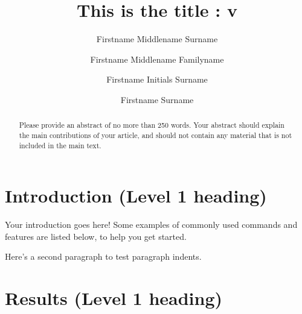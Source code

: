 \documentclass[9pt,bestpractices]{livecoms}
\title{This is the title : v\versionnumber}
\author[1*]{Firstname Middlename Surname}
\author[1,2\authfn{1}\authfn{3}]{Firstname Middlename Familyname}
\author[2\authfn{1}\authfn{4}]{Firstname Initials Surname}
\author[2*]{Firstname Surname}
\affil[1]{Institution 1}
\affil[2]{Institution 2}
\begin{document}
\begin{frontmatter}
\maketitle

\begin{abstract}
Please provide an abstract of no more than 250 words. Your abstract should explain the main contributions of your article, and should not contain any material that is not included in the main text.
\end{abstract}

\end{frontmatter}

\section{Introduction (Level 1 heading)}

Your introduction goes here! Some examples of commonly used commands and features are listed below, to help you get started.

Here's a second paragraph to test paragraph indents. \lipsum[1]

\section{Results (Level 1 heading)}

\lipsum[2-3]
\end{document}
